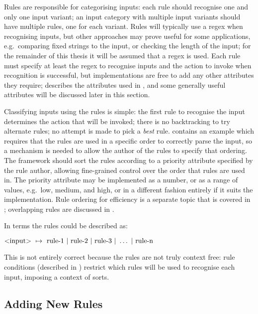 \label{rules in architecture}

Rules are responsible for categorising inputs: each rule should recognise
one and only one input variant; an input category with multiple input
variants should have multiple rules, one for each variant.  Rules will
typically use a regex when recognising inputs, but other approaches may
prove useful for some applications, e.g.\ comparing fixed strings to the
input, or checking the length of the input; for the remainder of this
thesis it will be assumed that a regex is used.  Each rule must specify at
least the regex to recognise inputs and the action to invoke when
recognition is successful, but implementations are free to add any other
attributes they require;  describes the
attributes used in \parsername{}, and some generally useful attributes will
be discussed later in this section.

Classifying inputs using the rules is simple: the first
rule to recognise the input determines the action that will be invoked;
there is no backtracking to try alternate rules; no attempt is made to pick
a \textit{best\/} rule.  
contains an example which requires that the rules are used in a specific
order to correctly parse the input, so a mechanism is needed to allow the
author of the rules to specify that ordering.  The framework should sort
the rules according to a priority attribute specified by the rule author,
allowing fine-grained control over the order that rules are used in.  The
priority attribute may be implemented as a number, or as a range of values,
e.g.\ low, medium, and high, or in a different fashion entirely if it suits
the implementation.  Rule ordering for efficiency is a separate topic that
is covered in ; overlapping rules
are discussed in .

In  terms the rules could be described as:

$\text{\textless{}input\textgreater{}}~\mapsto{}~\text{rule-1}~|~\text{rule-2}~|~\text{rule-3}~|~\dots~|~\text{rule-n}$

This is not entirely correct because the rules are not truly context free:
rule conditions (described in )
restrict which rules will be used to recognise each input, imposing a
context of sorts.

\subsection{Adding New Rules}

